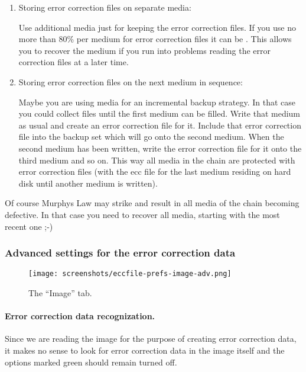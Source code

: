 \begin{enumerate}
\item Storing error correction files on separate media:

Use additional media just for keeping the error correction files.
If you use no more than 80\% per medium for error correction files
it can be .
This allows you to recover the medium if you run into problems reading
the error correction files at a later time.

\item Storing error correction files on the next medium in sequence:

Maybe you are using media for an incremental backup strategy.
In that case you could collect files until the first medium can be filled.
Write that medium as usual and create an error correction file for it.
Include that error correction file into the backup set which will go onto
the second medium. When the second medium has been written, write the error
correction file for it onto the third medium and so on. This way all media
in the chain are protected with error correction files (with the ecc file
for the last medium residing on hard disk until another medium is written).
\end{enumerate}

Of course Murphys Law may strike and result in all media of the chain
becoming defective. In that case you need to recover all media, starting
with the most recent one ;-)

\newpage
\subsubsection{Advanced settings for the error correction data}
\label{howto-eccfile-advanced-settings}
\label{howto-eccfile-advanced-settings-image}

\vspace{-4mm}
\begin{figure}[h]
\centerline{\texttt{[image: screenshots/eccfile-prefs-image-adv.png]}}
\caption{The ``Image'' tab.}  
\label{howto-eccfile-prefs-image-adv}
\end{figure}
\vspace{-6mm}

\paragraph{Error correction data recognization.} Since
we are reading the image for the purpose of creating error correction data, it
makes no sense to look for error correction data in the image itself and the options
marked green should remain turned off.

